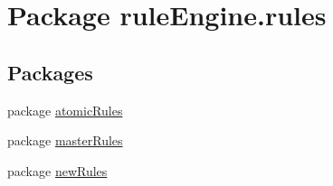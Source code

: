 \hypertarget{namespacerule_engine_1_1rules}{}\section{Package rule\+Engine.\+rules}
\label{namespacerule_engine_1_1rules}
\subsection*{Packages}
\begin{DoxyCompactItemize}
\item 
package \mbox{\hyperlink{namespacerule_engine_1_1rules_1_1atomic_rules}{atomic\+Rules}}
\item 
package \mbox{\hyperlink{namespacerule_engine_1_1rules_1_1master_rules}{master\+Rules}}
\item 
package \mbox{\hyperlink{namespacerule_engine_1_1rules_1_1new_rules}{new\+Rules}}
\end{DoxyCompactItemize}
